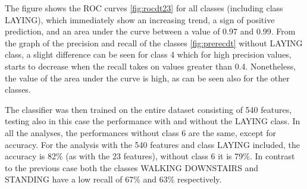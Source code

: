 \documentclass[10pt, a4paper, twocolumn]{article}
\begin{document}
The figure shows the ROC curves \ref{fig:rocdt23} for all classes (including class LAYING), which immediately show an increasing trend, a sign of positive prediction, and an area under the curve between a value of 0.97 and 0.99. From the graph of the precision and recall of the classes \ref{fig:prerecdt} without LAYING class, a slight difference can be seen for class 4 which for high precision values, starts to decrease when the recall takes on values greater than 0.4. Nonetheless, the value of the area under the curve is high, as can be seen also for the other classes.

The classifier was then trained on the entire dataset consisting of 540 features, testing also in this case the performance with and without the LAYING class. In all the analyses, the performances without class 6 are the same, except for accuracy. For the analysis with the 540 features and class LAYING included, the accuracy is 82\% (as with the 23 features), without class 6 it is 79\%. In contrast to the previous case both the classes WALKING DOWNSTAIRS and STANDING have a low recall of 67\% and 63\% respectively. 
\end{document}
